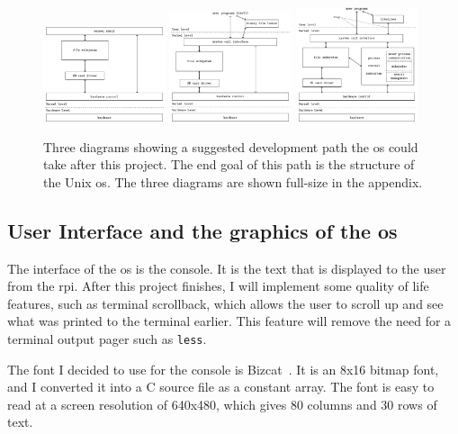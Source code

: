 \documentclass{article}
\begin{document}
\begin{figure}[htbp]
    \centering
    \includegraphics[width=0.32\textwidth]{build/finished-block-diagram.pdf}
    \includegraphics[width=0.32\textwidth]{build/nextstep-block-diagram.pdf}
    \includegraphics[width=0.32\textwidth]{build/os-block-diagram.pdf}
    \caption{Three diagrams showing a suggested development path the \gls{os}
    could take after this project. The end goal of this path is the structure
    of the Unix \gls{os}. The three diagrams are shown full-size in the
    appendix.}
    \label{fig:block_diagrams_progression}
\end{figure}

\subsection{User Interface and the graphics of the
\texorpdfstring{\gls{os}}{OS}}
The interface of the \gls{os} is the console. It is the text that is displayed
to the user from the \gls{rpi}. After this project finishes, I will implement
some quality of life features, such as terminal scrollback, which allows the
user to scroll up and see what was printed to the terminal earlier. This
feature will remove the need for a terminal output pager such as \texttt{less}.

The font I decided to use for the console is Bizcat~\cite{bizcat-font}. It is
an 8x16 bitmap font, and I converted it into a C source file as a constant
array. The font is easy to read at a screen resolution of 640x480, which gives
80 columns and 30 rows of text.
\end{document}
